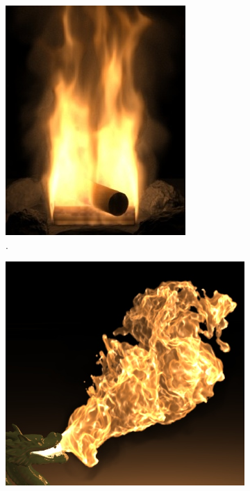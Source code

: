 \begin{figure}[htpb!]
\begin{subfigure}[t]{0.22\textwidth}
                \includegraphics[width=\textwidth]{img/nguyen_2002}
                \caption{\cite{Nguyen:2002}.}
        \end{subfigure}       
        \quad %
        \begin{subfigure}[t]{0.3\textwidth}
                \includegraphics[width=\textwidth]{img/hong_2007}

\end{subfigure}
\end{figure}
